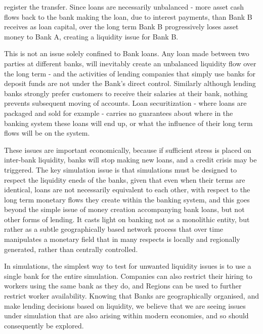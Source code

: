\documentclass[10pt,oneside,openright, a4paper]{memoir}
\begin{document}
register the transfer. Since loans are necessarily unbalanced - more
asset cash flows back to the bank making the loan, due to interest
payments, than Bank B receives as loan capital, over the long
term Bank B progressively loses asset money to Bank A, creating
a liquidity issue for Bank B.
\par
This is not an issue solely confined to Bank loans. Any loan
made between two parties at different banks, will inevitably
create an unbalanced liquidity flow over the long term - and
the activities of lending companies that simply use banks for
deposit funds are not under the Bank's direct control. Similarly
although lending banks strongly prefer customers to 
receive their salaries at their bank, nothing prevents 
subsequent moving of accounts. Loan
securitization - where loans are packaged and sold for example -
carries no guarantees about where in the banking system these
loans will end up, or what the influence of their long term
flows will be on the system. 
\par
These issues are important economically, because if sufficient
stress is placed on inter-bank liquidity, banks will stop making
new loans, and a credit crisis may be triggered. The key simulation
issue is that simulations must be designed to respect the liquidity
eneds of the banks, given that
even when their terms are identical, 
loans are not necessarily equivalent to each other, with respect
to the long term monetary flows they create
within the banking system, and this goes beyond
the simple issue of money creation accompanying bank loans, but not
other forms of lending. It casts light on banking not as a monolithic
entity, but rather as a subtle geographically based network process
that over time manipulates a monetary field that in many
respects is locally and regionally generated, rather than centrally
controlled.
\par
In simulations, the simplest way to test for unwanted liquidity issues
is to use a single bank for the entire simulation. Companies can
also restrict their hiring to workers using the same bank as they do,
and Regions can be used to further restrict worker availability.
Knowing that Banks are geographically organised, and make lending decisions 
based on liquidity, we believe that we are seeing issues under
simulation that are also arising within modern economies, and so
should consequently be explored.
\end{document}
